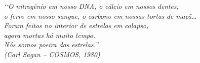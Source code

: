


\begin{epigrafe}

	\vspace*{\fill}

	\begin{flushright}

	\textit{
	‘‘O nitrogênio em nosso DNA, o cálcio em nossos dentes, 			\\
	o ferro em nosso sangue, o carbono em nossas tortas de maçã…		\\
	Foram feitos no interior de estrelas em colapso,					\\
	agora mortas há muito tempo.										\\
	Nós somos poeira das estrelas.''									\\
	(Carl Sagan – COSMOS, 1980)}

	\end{flushright}

\end{epigrafe}